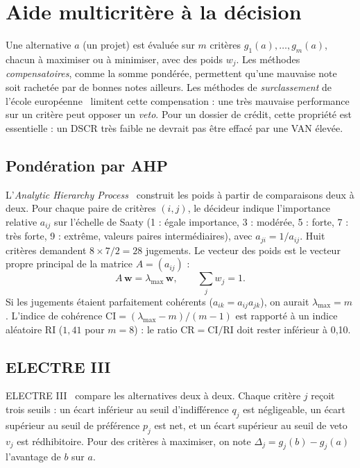\section{Aide multicritère à la décision}

Une alternative $a$ (un projet) est évaluée sur $m$ critères $g_1(a), \dots, g_m(a)$, chacun à maximiser ou à
minimiser, avec des poids $w_j$. Les méthodes \emph{compensatoires}, comme la somme pondérée, permettent qu'une
mauvaise note soit rachetée par de bonnes notes ailleurs. Les méthodes de \emph{surclassement} de l'école
européenne~\cite{roy1991,figueira2005} limitent cette compensation : une très mauvaise performance sur un critère
peut opposer un \emph{veto}. Pour un dossier de crédit, cette propriété est essentielle : un DSCR très faible ne
devrait pas être effacé par une VAN élevée.

\subsection{Pondération par AHP}

L'\textit{Analytic Hierarchy Process}~\cite{saaty1980} construit les poids à partir de comparaisons deux à deux. Pour
chaque paire de critères $(i,j)$, le décideur indique l'importance relative $a_{ij}$ sur l'échelle de Saaty (1 :
égale importance, 3 : modérée, 5 : forte, 7 : très forte, 9 : extrême, valeurs paires intermédiaires), avec
$a_{ji} = 1/a_{ij}$. Huit critères demandent $8\times7/2 = 28$ jugements. Le vecteur des poids est le vecteur propre
principal de la matrice $A = (a_{ij})$ :
\begin{equation}
  A\,\bm{w} = \lambda_{\max}\,\bm{w}, \qquad \sum_j w_j = 1 .
\end{equation}
Si les jugements étaient parfaitement cohérents ($a_{ik} = a_{ij}a_{jk}$), on aurait $\lambda_{\max} = m$. L'indice
de cohérence $\mathrm{CI} = (\lambda_{\max}-m)/(m-1)$ est rapporté à un indice aléatoire $\mathrm{RI}$ ($1{,}41$ pour
$m = 8$) : le ratio $\mathrm{CR} = \mathrm{CI}/\mathrm{RI}$ doit rester inférieur à 0,10.

\subsection{ELECTRE III}

ELECTRE III~\cite{roy1978} compare les alternatives deux à deux. Chaque critère $j$ reçoit trois seuils : un écart
inférieur au seuil d'indifférence $q_j$ est négligeable, un écart supérieur au seuil de préférence $p_j$ est net, et
un écart supérieur au seuil de veto $v_j$ est rédhibitoire. Pour des critères à maximiser, on note
$\Delta_j = g_j(b) - g_j(a)$ l'avantage de $b$ sur $a$.

